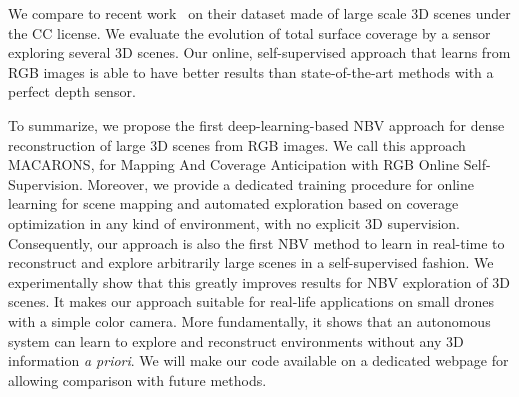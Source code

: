 We compare to recent work~\cite{guedon-nips22-scone-surface-coverage} on their dataset made of large scale 3D scenes under the CC license. We evaluate the evolution of total surface coverage by a sensor exploring several 3D scenes. Our online, self-supervised approach that learns from RGB images is able to have better results than state-of-the-art methods with a perfect depth sensor.

To summarize, we propose the first deep-learning-based NBV approach for dense reconstruction of large 3D scenes from RGB images. We call this approach MACARONS, for Mapping And Coverage Anticipation with RGB Online Self-Supervision. Moreover, we provide a dedicated training procedure for online learning for scene mapping and automated exploration based on coverage optimization in any kind of environment, with no explicit 3D supervision. Consequently, our approach is also the first NBV method to learn in real-time to reconstruct and explore arbitrarily large scenes in a self-supervised fashion. We experimentally show that this greatly improves results for NBV exploration of 3D scenes. It makes our approach suitable for real-life applications on small drones with a simple color camera. More fundamentally, it shows that an autonomous system can learn to explore and reconstruct environments without any 3D information \emph{a priori}. We will make our code available on a dedicated webpage for allowing comparison with future methods.